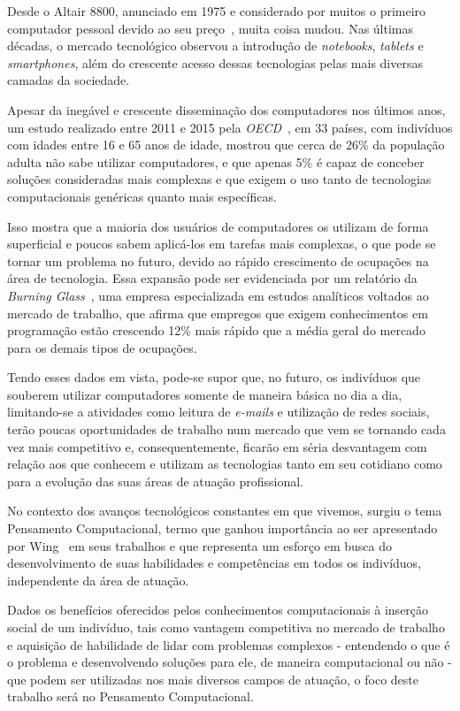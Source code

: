 Desde o Altair 8800, anunciado em 1975 e considerado por muitos o primeiro computador pessoal devido ao seu preço~\cite{computer_campbell_2013}, muita coisa mudou. Nas últimas décadas, o mercado tecnológico observou a introdução de \textit{notebooks}, \textit{tablets} e \textit{smartphones}, além do crescente acesso dessas tecnologias pelas mais diversas camadas da sociedade.

Apesar da inegável e crescente disseminação dos computadores nos últimos anos, um estudo realizado entre 2011 e 2015 pela \textit{\acrfull{OECD}}~\cite{oecd_shills_2016}, em 33 países, com indivíduos com idades entre 16 e 65 anos de idade, mostrou que cerca de 26\% da população adulta não sabe utilizar computadores, e que apenas 5\% é capaz de conceber soluções consideradas mais complexas e que exigem o uso tanto de tecnologias computacionais genéricas quanto mais específicas.

Isso mostra que a maioria dos usuários de computadores os utilizam de forma superficial e poucos sabem aplicá-los em tarefas mais complexas, o que pode se tornar um problema no futuro, devido ao rápido crescimento de ocupações na área de tecnologia. Essa expansão pode ser evidenciada por um relatório da \textit{Burning Glass}~\cite{beyond_burning_2016}, uma empresa especializada em estudos analíticos voltados ao mercado de trabalho, que afirma que empregos que exigem conhecimentos em programação estão crescendo 12\% mais rápido que a média geral do mercado para os demais tipos de ocupações.  

Tendo esses dados em vista, pode-se supor que, no futuro, os indivíduos que souberem utilizar computadores somente de maneira básica no dia a dia, limitando-se a atividades como leitura de \textit{e-mails} e utilização de redes sociais, terão poucas oportunidades de trabalho num mercado que vem se tornando cada vez mais competitivo e, consequentemente, ficarão em séria desvantagem com relação aos que conhecem e utilizam as tecnologias tanto em seu cotidiano como para a evolução das suas áreas de atuação profissional. 

No contexto dos avanços tecnológicos constantes em que vivemos, surgiu o tema Pensamento Computacional, termo que ganhou importância ao ser apresentado por Wing~\cite{wing_computational_2006, wing_computational_2008, wing_computational_2011} em seus trabalhos e que representa um esforço em busca do desenvolvimento de suas habilidades e competências em todos os indivíduos, independente da área de atuação.

Dados os benefícios oferecidos pelos conhecimentos computacionais à inserção social de um indivíduo, tais como vantagem competitiva no mercado de trabalho e aquisição de habilidade de lidar com problemas complexos - entendendo o que é o problema e desenvolvendo soluções para ele, de maneira computacional ou não - que podem ser utilizadas nos mais diversos campos de atuação, o foco deste trabalho será no Pensamento Computacional.

